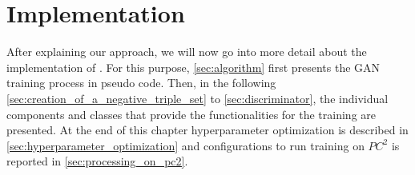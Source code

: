 \chapter{Implementation}
\label{ch:implementation}


After explaining our approach, we will now go into more detail about the implementation of \ucgan.
For this purpose, \autoref{sec:algorithm} first presents the \ac{GAN} training process in pseudo code.
Then, in the following \autoref{sec:creation_of_a_negative_triple_set} to \ref{sec:discriminator}, the individual components and classes that provide the functionalities for the training are presented.
At the end of this chapter hyperparameter optimization is described in \autoref{sec:hyperparameter_optimization} and configurations to run training on $PC^2$ is reported in \autoref{sec:processing_on_pc2}.

















